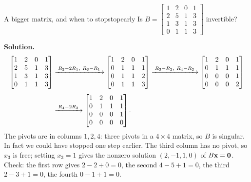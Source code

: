 \documentclass[11pt]{article}
\begin{document}
\begin{exmp}{A bigger matrix, and when to stop}{stopearly}
Is $B=\begin{bmatrix}1&2&0&1\\2&5&1&3\\1&3&1&3\\0&1&1&3\end{bmatrix}$ invertible?

\textbf{Solution.}
\begin{align*}
\begin{bmatrix}1&2&0&1\\2&5&1&3\\1&3&1&3\\0&1&1&3\end{bmatrix}
&\xrightarrow{\;R_2-2R_1,\ R_3-R_1\;}
\begin{bmatrix}1&2&0&1\\0&1&1&1\\0&1&1&2\\0&1&1&3\end{bmatrix}
\xrightarrow{\;R_3-R_2,\ R_4-R_2\;}
\begin{bmatrix}1&2&0&1\\0&1&1&1\\0&0&0&1\\0&0&0&2\end{bmatrix}\\[4pt]
&\xrightarrow{\;R_4-2R_3\;}
\begin{bmatrix}1&2&0&1\\0&1&1&1\\0&0&0&1\\0&0&0&0\end{bmatrix}.
\end{align*}
The pivots are in columns $1,2,4$: three pivots in a $4\times4$ matrix, so $B$ is singular. In fact we could have stopped one step earlier. The third column has no pivot, so $x_3$ is free; setting $x_3=1$ gives the nonzero solution $(2,-1,1,0)$ of $B\mathbf{x}=\mathbf{0}$. Check: the first row gives $2-2+0=0$, the second $4-5+1=0$, the third $2-3+1=0$, the fourth $0-1+1=0$.
\end{exmp}
\end{document}
